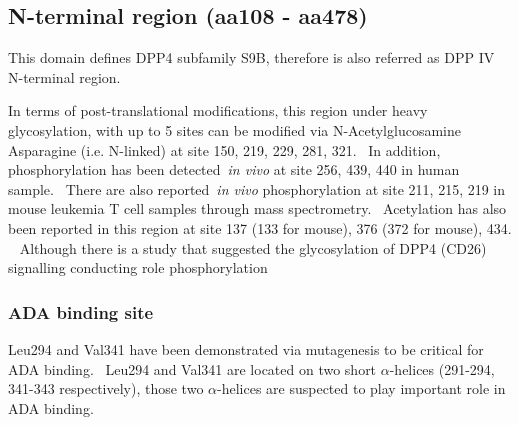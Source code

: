\subsection{N-terminal region (aa108 - aa478)}

This domain defines DPP4 subfamily S9B, therefore is also referred as DPP IV N-terminal region. 

In terms of post-translational modifications, this region under heavy glycosylation, with up to 5 sites can be modified via N-Acetylglucosamine Asparagine (i.e. N-linked) at site 150, 219, 229, 281, 321.~\cite{Rasmussen2003,Thoma2003,Meng2010,Chen2009,Hiramatsu2003} In addition, phosphorylation has been detected~\textit{in vivo} at site 256, 439, 440 in human sample.~\cite{Hornbeck2015, Mertins2014} There are also reported~\textit{in vivo} phosphorylation at site 211, 215, 219 in mouse leukemia T cell samples through mass spectrometry.~\cite{Hornbeck2015} 
Acetylation has also been reported in this region at site 137 (133 for mouse), 376 (372 for mouse), 434. ~\cite{Lundby2012,Weinert2013} Although there is a study that suggested the glycosylation of DPP4 (CD26)  signalling conducting role phosphorylation 

\subsubsection{ADA binding site}
Leu294 and Val341 have been demonstrated via mutagenesis to be critical for ADA binding.~\cite{Abbott_1999} Leu294 and Val341 are located on two short $\alpha$-helices (291-294, 341-343 respectively), those two $\alpha$-helices are suspected to play important role in ADA binding. 